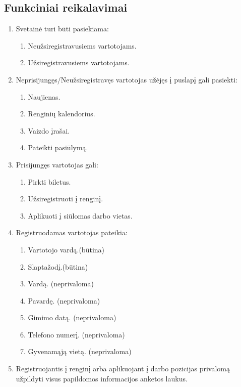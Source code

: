 \documentclass{VUMIFPSkursinis}
\begin{document}
        \subsection{Funkciniai reikalavimai} \label{reikalavimai_fr}
			\begin{enumerate}[label=\textbf{FR\arabic*}]
				\item Svetainė turi būti pasiekiama:
					\begin{enumerate}[label*=\textbf{.\arabic*}]
						\item Neužsiregistravusiems vartotojams.
						\item Užsiregistravusiems vartotojams.
					\end{enumerate}
				\item Neprisijungęs/Neužsiregistravęs vartotojas užėjęs į puslapį gali pasiekti:
					\begin{enumerate}[label*=\textbf{.\arabic*}]
						\item Naujienas.
						\item Renginių kalendorius.
						\item Vaizdo įrašai.
						\item Pateikti pasiūlymą.
					\end{enumerate}	
				\item Prisijungęs vartotojas gali:
					\begin{enumerate}[label*=\textbf{.\arabic*}]
						\item Pirkti biletus.
						\item Užsiregistruoti į renginį.
						\item Aplikuoti į siūlomas darbo vietas.
					\end{enumerate}
				\item Registruodamas vartotojas pateikia:
					\begin{enumerate}[label*=\textbf{.\arabic*}]
						\item Vartotojo vardą.(būtina)
						\item Slaptažodį.(būtina)
						\item Vardą. (neprivaloma)
						\item Pavardę. (neprivaloma)
						\item Gimimo datą. (neprivaloma)
						\item Telefono numerį. (neprivaloma)
						\item Gyvenamąją vietą. (neprivaloma)
					\end{enumerate}
				\item Registruojantis į renginį arba aplikuojant į darbo pozicijas privalomą užpildyti visus papildomos informacijos anketos laukus.

\end{enumerate}
\end{document}
